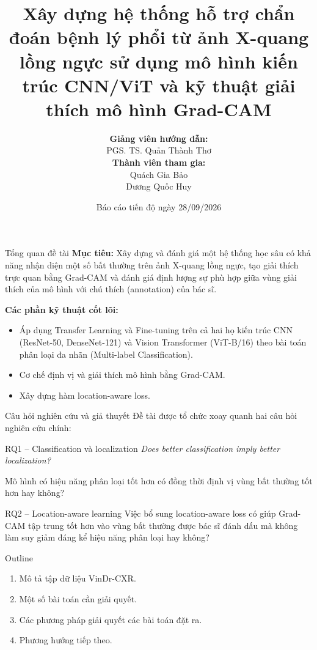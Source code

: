 \documentclass[10pt]{beamer}
\title[Báo cáo tiến độ ĐATH]{Xây dựng hệ thống hỗ trợ chẩn đoán bệnh lý phổi từ ảnh X-quang lồng ngực sử dụng mô hình kiến trúc CNN/ViT và kỹ thuật giải thích mô hình Grad-CAM}
\author[Bảo, Huy]{
    \textbf{Giảng viên hướng dẫn:}\\
    \vspace{0.1cm}
    PGS. TS. Quản Thành Thơ\\
    \vspace{0.5cm}
    \textbf{Thành viên tham gia:}\\
    \vspace{0.1cm}
    Quách Gia Bảo\\
    Dương Quốc Huy\\
}
\date{Báo cáo tiến độ ngày 28/09/2026}
\begin{document}
\begin{frame}
    \titlepage
\end{frame}

\begin{frame}{Tổng quan đề tài}
    \textbf{Mục tiêu:} Xây dựng và đánh giá một hệ thống học sâu có khả năng nhận diện một số bất thường trên ảnh X-quang lồng ngực, tạo giải thích trực quan bằng Grad-CAM và đánh giá định lượng sự phù hợp giữa vùng giải thích của mô hình với chú thích (annotation) của bác sĩ.
    \vspace{0.3cm}

    \textbf{Các phần kỹ thuật cốt lõi:}
    \begin{itemize}
        \item Áp dụng Transfer Learning và Fine-tuning trên cả hai họ kiến trúc CNN (ResNet-50, DenseNet-121) và Vision Transformer (ViT-B/16) theo bài toán phân loại đa nhãn (Multi-label Classification).
        \item Cơ chế định vị và giải thích mô hình bằng Grad-CAM.
        \item Xây dựng hàm location-aware loss.
    \end{itemize}
\end{frame}

\begin{frame}{Câu hỏi nghiên cứu và giả thuyết}
    Đề tài được tổ chức xoay quanh hai câu hỏi nghiên cứu chính:

    \begin{block}{RQ1 -- Classification và localization}
        \textit{Does better classification imply better localization?}

        \medskip
        Mô hình có hiệu năng phân loại tốt hơn có đồng thời định vị vùng bất thường tốt hơn hay không?
    \end{block}

    \begin{block}{RQ2 -- Location-aware learning}
        Việc bổ sung location-aware loss có giúp Grad-CAM tập trung tốt hơn vào vùng bất thường được bác sĩ đánh dấu mà không làm suy giảm đáng kể hiệu năng phân loại hay không?
    \end{block}
\end{frame}

\begin{frame}{Outline}
    \begin{enumerate}
        \item Mô tả tập dữ liệu VinDr-CXR.
        \item Một số bài toán cần giải quyết.
        \item Các phương pháp giải quyết các bài toán đặt ra.
        \item Phương hướng tiếp theo.
    \end{enumerate}
\end{frame}
\end{document}

